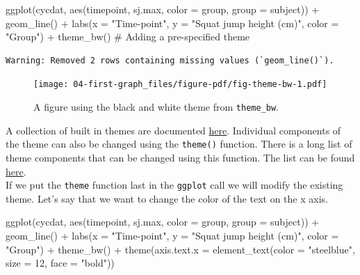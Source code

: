\documentclass[
  11pt,
  letterpaper,
]{scrbook}
\newenvironment{Shaded}{\begin{snugshade}}{\end{snugshade}}
\newcommand{\AttributeTok}[1]{\textcolor[rgb]{0.40,0.45,0.13}{#1}}
\newcommand{\CommentTok}[1]{\textcolor[rgb]{0.37,0.37,0.37}{#1}}
\newcommand{\DecValTok}[1]{\textcolor[rgb]{0.68,0.00,0.00}{#1}}
\newcommand{\FunctionTok}[1]{\textcolor[rgb]{0.28,0.35,0.67}{#1}}
\newcommand{\NormalTok}[1]{\textcolor[rgb]{0.00,0.23,0.31}{#1}}
\newcommand{\SpecialCharTok}[1]{\textcolor[rgb]{0.37,0.37,0.37}{#1}}
\newcommand{\StringTok}[1]{\textcolor[rgb]{0.13,0.47,0.30}{#1}}
\begin{document}
\begin{Shaded}
\begin{Highlighting}[numbers=left,,]
\FunctionTok{ggplot}\NormalTok{(cycdat, }\FunctionTok{aes}\NormalTok{(timepoint, sj.max, }\AttributeTok{color =}\NormalTok{ group, }\AttributeTok{group =}\NormalTok{ subject)) }\SpecialCharTok{+} 
  \FunctionTok{geom\_line}\NormalTok{() }\SpecialCharTok{+}
  \FunctionTok{labs}\NormalTok{(}\AttributeTok{x =} \StringTok{"Time{-}point"}\NormalTok{,}
       \AttributeTok{y =} \StringTok{"Squat jump height (cm)"}\NormalTok{, }
       \AttributeTok{color =} \StringTok{"Group"}\NormalTok{) }\SpecialCharTok{+} 
  \FunctionTok{theme\_bw}\NormalTok{() }\CommentTok{\# Adding a pre{-}specified theme}
\end{Highlighting}
\end{Shaded}

\begin{verbatim}
Warning: Removed 2 rows containing missing values (`geom_line()`).
\end{verbatim}

\begin{figure}[H]

{\centering \texttt{[image: 04-first-graph\_files/figure-pdf/fig-theme-bw-1.pdf]}

}

\caption{\label{fig-theme-bw}A figure using the black and white theme
from \texttt{theme\_bw}.}

\end{figure}

A collection of built in themes are documented
\href{https://ggplot2.tidyverse.org/reference/ggtheme.html}{here}.
Individual components of the theme can also be changed using the
\texttt{theme()} function. There is a long list of theme components that
can be changed using this function. The list can be found
\href{https://ggplot2.tidyverse.org/reference/theme.html}{here}.\\
If we put the \texttt{theme} function last in the \texttt{ggplot} call
we will modify the existing theme. Let's say that we want to change the
color of the text on the x axis.

\begin{Shaded}
\begin{Highlighting}[numbers=left,,]
\FunctionTok{ggplot}\NormalTok{(cycdat, }\FunctionTok{aes}\NormalTok{(timepoint, sj.max, }\AttributeTok{color =}\NormalTok{ group, }\AttributeTok{group =}\NormalTok{ subject)) }\SpecialCharTok{+} 
  \FunctionTok{geom\_line}\NormalTok{() }\SpecialCharTok{+}
  \FunctionTok{labs}\NormalTok{(}\AttributeTok{x =} \StringTok{"Time{-}point"}\NormalTok{,}
       \AttributeTok{y =} \StringTok{"Squat jump height (cm)"}\NormalTok{, }
       \AttributeTok{color =} \StringTok{"Group"}\NormalTok{) }\SpecialCharTok{+} 
  \FunctionTok{theme\_bw}\NormalTok{() }\SpecialCharTok{+}
  \FunctionTok{theme}\NormalTok{(}\AttributeTok{axis.text.x =} \FunctionTok{element\_text}\NormalTok{(}\AttributeTok{color =} \StringTok{"steelblue"}\NormalTok{, }\AttributeTok{size =} \DecValTok{12}\NormalTok{, }\AttributeTok{face =} \StringTok{"bold"}\NormalTok{))}
\end{Highlighting}
\end{Shaded}
\end{document}
